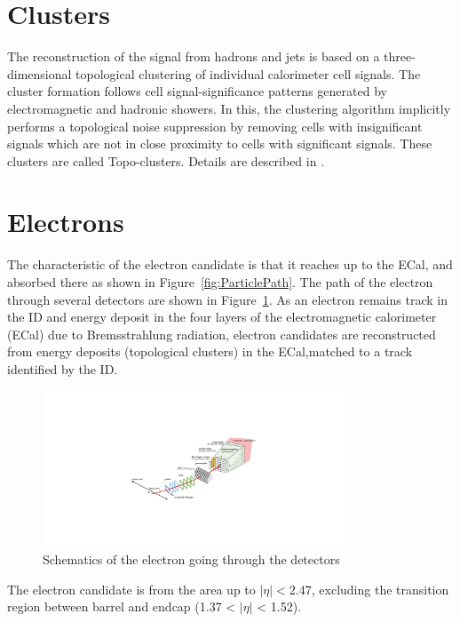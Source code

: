 \section{Clusters}
The reconstruction of the signal from hadrons and jets is based on a three-dimensional topological clustering of individual calorimeter cell signals.
The cluster formation follows cell signal-significance patterns generated by electromagnetic and hadronic showers. In this, the clustering algorithm implicitly performs a topological noise suppression by removing cells with insignificant signals which are not in close proximity to cells with significant signals. These clusters are called Topo-clusters. Details are described in \cite{PERF-2014-07}.
\section{Electrons}
The characteristic of the electron candidate is that it reaches up to the ECal, and absorbed there as shown in Figure~\ref{fig:ParticlePath}. The path of the electron through several detectors are shown in Figure~\ref{fig:electronPath}. As an electron remains track in the ID and energy deposit in the four layers of the electromagnetic calorimeter (ECal) due to Bremsstrahlung radiation, electron candidates are reconstructed from energy deposits (topological clusters) in the ECal,matched to a track identified by the ID.
\begin{figure}[tbp]
\begin{center}
 \includegraphics[width=0.80\textwidth,keepaspectratio]{figures/Reconstruction/electronPath}
\caption{
Schematics of the electron going through the detectors
}
\label{fig:electronPath}
\end{center}
\end{figure}
The electron candidate is from the area up to $|\eta|<2.47$, excluding the transition region between barrel and endcap (1.37 < $|\eta|$ < 1.52).

